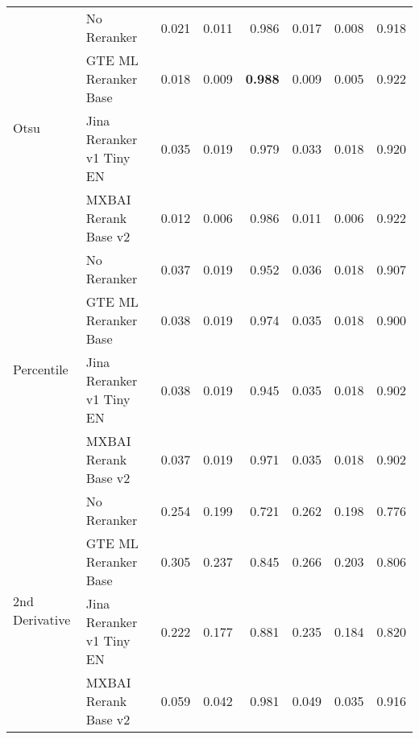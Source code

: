 \begin{table*}[htbp]
\begin{tabular}{llrrrrrr}
\cline{1-8}
\multirow[t]{4}{*}{Otsu} & No Reranker & 0.021 & 0.011 & 0.986 & 0.017 & 0.008 & 0.918 \\
 & GTE ML Reranker Base & 0.018 & 0.009 & \textbf{0.988} & 0.009 & 0.005 & 0.922 \\
 & Jina Reranker v1 Tiny EN & 0.035 & 0.019 & 0.979 & 0.033 & 0.018 & 0.920 \\
 & MXBAI Rerank Base v2 & 0.012 & 0.006 & 0.986 & 0.011 & 0.006 & 0.922 \\
\cline{1-8}
\multirow[t]{4}{*}{Percentile} & No Reranker & 0.037 & 0.019 & 0.952 & 0.036 & 0.018 & 0.907 \\
 & GTE ML Reranker Base & 0.038 & 0.019 & 0.974 & 0.035 & 0.018 & 0.900 \\
 & Jina Reranker v1 Tiny EN & 0.038 & 0.019 & 0.945 & 0.035 & 0.018 & 0.902 \\
 & MXBAI Rerank Base v2 & 0.037 & 0.019 & 0.971 & 0.035 & 0.018 & 0.902 \\
\cline{1-8}
\multirow[t]{4}{*}{2nd Derivative} & No Reranker & 0.254 & 0.199 & 0.721 & 0.262 & 0.198 & 0.776 \\
 & GTE ML Reranker Base & 0.305 & 0.237 & 0.845 & 0.266 & 0.203 & 0.806 \\
 & Jina Reranker v1 Tiny EN & 0.222 & 0.177 & 0.881 & 0.235 & 0.184 & 0.820 \\
 & MXBAI Rerank Base v2 & 0.059 & 0.042 & 0.981 & 0.049 & 0.035 & 0.916 \\
\cline{1-8}
\bottomrule
\end{tabular}
\end{table*}
